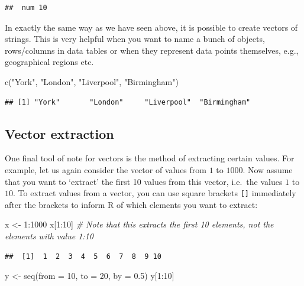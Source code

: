 \documentclass[
]{book}
\newenvironment{Shaded}{\begin{snugshade}}{\end{snugshade}}
\newcommand{\AttributeTok}[1]{\textcolor[rgb]{0.77,0.63,0.00}{#1}}
\newcommand{\CommentTok}[1]{\textcolor[rgb]{0.56,0.35,0.01}{\textit{#1}}}
\newcommand{\DecValTok}[1]{\textcolor[rgb]{0.00,0.00,0.81}{#1}}
\newcommand{\FloatTok}[1]{\textcolor[rgb]{0.00,0.00,0.81}{#1}}
\newcommand{\FunctionTok}[1]{\textcolor[rgb]{0.00,0.00,0.00}{#1}}
\newcommand{\NormalTok}[1]{#1}
\newcommand{\OtherTok}[1]{\textcolor[rgb]{0.56,0.35,0.01}{#1}}
\newcommand{\SpecialCharTok}[1]{\textcolor[rgb]{0.00,0.00,0.00}{#1}}
\newcommand{\StringTok}[1]{\textcolor[rgb]{0.31,0.60,0.02}{#1}}
\theoremstyle{definition}
\theoremstyle{definition}
\theoremstyle{definition}
\theoremstyle{definition}
\theoremstyle{remark}
\begin{document}
\begin{verbatim}
##  num 10
\end{verbatim}

In exactly the same way as we have seen above, it is possible to create vectors of strings. This is very helpful when you want to name a bunch of objects, rows/columns in data tables or when they represent data points themselves, e.g., geographical regions etc.

\begin{Shaded}
\begin{Highlighting}[]
\FunctionTok{c}\NormalTok{(}\StringTok{"York"}\NormalTok{, }\StringTok{"London"}\NormalTok{, }\StringTok{"Liverpool"}\NormalTok{, }\StringTok{"Birmingham"}\NormalTok{)}
\end{Highlighting}
\end{Shaded}

\begin{verbatim}
## [1] "York"       "London"     "Liverpool"  "Birmingham"
\end{verbatim}

\hypertarget{vector-extraction}{%
\subsection{Vector extraction}\label{vector-extraction}}

One final tool of note for vectors is the method of extracting certain values. For example, let us again consider the vector of values from \(1\) to \(1000\). Now assume that you want to `extract' the first 10 values from this vector, i.e.~the values \(1\) to \(10\). To extract values from a vector, you can use square brackets \texttt{{[}{]}} immediately after the brackets to inform R of which elements you want to extract:

\begin{Shaded}
\begin{Highlighting}[]
\NormalTok{x }\OtherTok{\textless{}{-}} \DecValTok{1}\SpecialCharTok{:}\DecValTok{1000}
\NormalTok{x[}\DecValTok{1}\SpecialCharTok{:}\DecValTok{10}\NormalTok{] }\CommentTok{\# Note that this extracts the first 10 elements, not the elements with value 1:10}
\end{Highlighting}
\end{Shaded}

\begin{verbatim}
##  [1]  1  2  3  4  5  6  7  8  9 10
\end{verbatim}

\begin{Shaded}
\begin{Highlighting}[]
\NormalTok{y }\OtherTok{\textless{}{-}} \FunctionTok{seq}\NormalTok{(}\AttributeTok{from =} \DecValTok{10}\NormalTok{, }\AttributeTok{to =} \DecValTok{20}\NormalTok{, }\AttributeTok{by =} \FloatTok{0.5}\NormalTok{)}
\NormalTok{y[}\DecValTok{1}\SpecialCharTok{:}\DecValTok{10}\NormalTok{]}
\end{Highlighting}
\end{Shaded}
\end{document}
